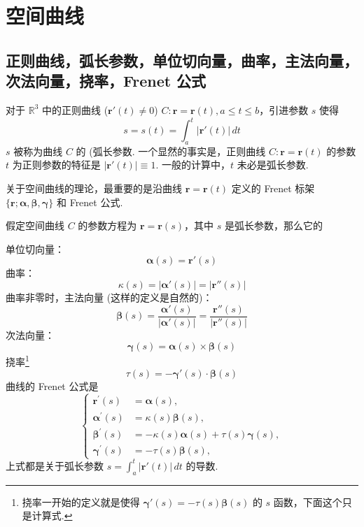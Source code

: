 \section{空间曲线}

\subsection{正则曲线，弧长参数，单位切向量，曲率，主法向量，次法向量，挠率，Frenet 公式}

对于 $\mathbb{R}^3$ 中的正则曲线 ($\boldsymbol{r}'(t)\neq0$) $C:\boldsymbol{r}=\boldsymbol{r}(t),a\leq t\leq b$，引进参数 $s$ 使得
\[
s=s(t)=\int_{a}^{t} \lvert \boldsymbol{r}'(t) \rvert  \, dt
\]
$s$ 被称为曲线 $C$ 的 (弧长参数. 一个显然的事实是，正则曲线 $C:\boldsymbol{r}=\boldsymbol{r}(t)$ 的参数 $t$ 为正则参数的特征是 $\lvert \boldsymbol{r}'(t) \rvert\equiv1$. 一般的计算中，$t$ 未必是弧长参数.

关于空间曲线的理论，最重要的是沿曲线 $\boldsymbol{r}=\boldsymbol{r}(t)$ 定义的 Frenet 标架 $\{ \boldsymbol{r};\boldsymbol{\alpha},\boldsymbol{\beta},\boldsymbol{\gamma} \}$ 和 Frenet 公式.

假定空间曲线 $C$ 的参数方程为 $\boldsymbol{r}=\boldsymbol{r}(s)$，其中 $s$ 是弧长参数，那么它的

单位切向量：
\[
\boldsymbol{\alpha}(s)=\boldsymbol{r}'(s)
\]
曲率：
\[
\kappa(s)=\lvert \boldsymbol{\alpha}'(s) \rvert =\lvert \boldsymbol{r}''(s) \rvert 
\]
曲率非零时，主法向量 (这样的定义是自然的)：
\[
\boldsymbol{\beta}(s)=\frac{\boldsymbol{\alpha}'(s)}{\lvert \boldsymbol{\alpha}'(s) \rvert }=\frac{\boldsymbol{r}''(s)}{\lvert \boldsymbol{r}''(s) \rvert }
\]
次法向量：
\[
\boldsymbol{\gamma}(s)=\boldsymbol{\alpha}(s)\times \boldsymbol{\beta}(s)
\]
挠率\footnote{挠率一开始的定义就是使得 $\boldsymbol{\gamma}'(s)=-\tau(s)\boldsymbol{\beta}(s)$ 的 $s$ 函数，下面这个只是计算式.}
\[
\tau(s)=-\boldsymbol{\gamma}'(s)\cdot\boldsymbol{\beta}(s)
\]
曲线的 Frenet 公式是
\[
\begin{cases}
\boldsymbol{r}^{\prime}(s) &= \boldsymbol{\alpha}(s), \\
\boldsymbol{\alpha}^{\prime}(s) &= \kappa(s) \boldsymbol{\beta}(s), \\
\boldsymbol{\beta}^{\prime}(s) &= -\kappa(s) \boldsymbol{\alpha}(s) + \tau(s) \boldsymbol{\gamma}(s), \\
\boldsymbol{\gamma}^{\prime}(s) &= -\tau(s) \boldsymbol{\beta}(s),
\end{cases}
\]
上式都是关于弧长参数 $s=\int_{a}^{t} \lvert \boldsymbol{r}'(t) \rvert \, dt$ 的导数.

